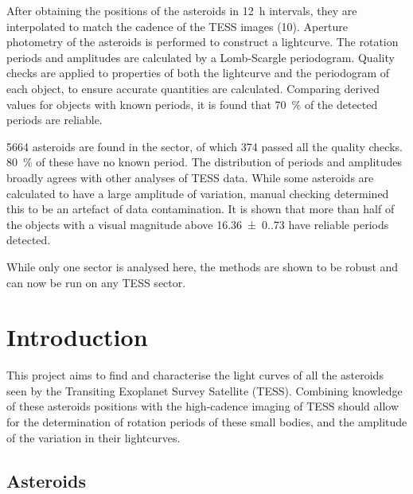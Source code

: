 \documentclass{UCreport}
\begin{document}
After obtaining the positions of the asteroids in \qty{12}{\hour} intervals, they are interpolated to match the cadence of the TESS images (\qty{10}{\min}).
Aperture photometry of the asteroids is performed to construct a lightcurve.
The rotation periods and amplitudes are calculated by a Lomb-Scargle periodogram.
Quality checks are applied to properties of both the lightcurve and the periodogram of each object, to ensure accurate quantities are calculated. 
Comparing derived values for objects with known periods, it is found that \qty{70}{\percent} of the detected periods are reliable.

5664 asteroids are found in the sector, of which 374 passed all the quality checks.
\qty{80}{\percent} of these have no known period. 
The distribution of periods and amplitudes broadly agrees with other analyses of TESS data.
While some asteroids are calculated to have a large amplitude of variation, manual checking determined this to be an artefact of data contamination.
It is shown that more than half of the objects with a visual magnitude above \qty{16.36(0.73)}{\mag} have reliable periods detected.

While only one sector is analysed here, the methods are shown to be robust and can now be run on any TESS sector. 

\newpage

\toc %

\listoffigures
\newpage
{}
\listoftables
\newpage


\section{Introduction}\label{Sec:Intro}

This project aims to find and characterise the light curves of all the asteroids seen by the Transiting Exoplanet Survey Satellite (TESS).
Combining knowledge of these asteroids positions with the high-cadence imaging of TESS should allow for the determination of rotation periods of these small bodies, and the amplitude of the variation in their lightcurves.


\subsection{Asteroids}\label{SubSec:Asteroid}
\end{document}
